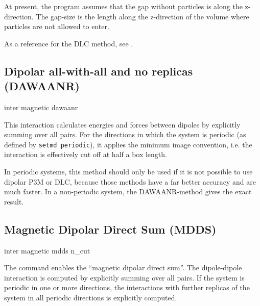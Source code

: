 At present, the program assumes that the gap without particles is
along the z-direction.  The gap-size is the length along the
z-direction of the volume where particles are not allowed to enter.

As a reference for the DLC method, see \cite{brodka04a}.

\subsection{Dipolar all-with-all and no replicas (DAWAANR)}

\begin{essyntax}
  inter magnetic  dawaanr
  \begin{features}
  \end{features}
\end{essyntax}

This interaction calculates energies and forces between dipoles by
explicitly summing over all pairs.  For the directions in which the
system is periodic (as defined by \texttt{setmd periodic}), it applies
the minimum image convention, i.e. the interaction is effectively cut
off at half a box length.

In periodic systems, this method should only be used if it is not possible to use dipolar P3M or
DLC, because those methods have a far better accuracy and are much faster.
In a non-periodic system, the DAWAANR-method gives the exact result.

\subsection{Magnetic Dipolar Direct Sum (MDDS)}

\begin{essyntax}
  inter magnetic  mdds n\_cut 
  \begin{features}
  \end{features}
\end{essyntax}

The command enables the ``magnetic dipolar direct sum''.  The
dipole-dipole interaction is computed by explicitly summing over all
pairs. If the system is periodic in one or more directions, the
interactions with further  replicas of the system
in all periodic directions is explicitly computed.

